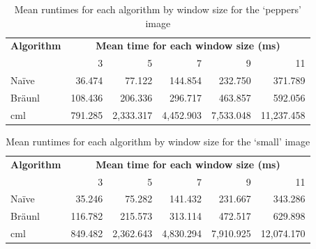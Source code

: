 \begin{table}
\centering
\begin{tabular}{@{}lrrrrr@{}}
\toprule
\multicolumn{1}{c}{\textbf{Algorithm}} & \multicolumn{5}{c}{\textbf{Mean time for each window size (ms)}}  \\
                              & 3       & 5         & 7         & 9         & 11         \\ \midrule
Naïve                         & 36.474  & 77.122    & 144.854   & 232.750   & 371.789    \\
Bräunl                        & 108.436 & 206.336   & 296.717   & 463.857   & 592.056    \\
\gls{cml}                           & 791.285 & 2,333.317 & 4,452.903 & 7,533.048 & 11,237.458 \\ \bottomrule
\end{tabular}
\caption[Mean runtimes for each algorithm for the `peppers' image]{
\label{tab:median:peppers}Mean runtimes for each algorithm by window size for the `peppers' image}
\end{table}

\begin{table}
\centering
\caption[Mean runtimes for each algorithm for the `small' image]{Mean runtimes for each algorithm by window size for the `small' image}
\label{tab:median:small}
\begin{tabular}{@{}lrrrrr@{}}
\toprule
\multicolumn{1}{c}{\textbf{Algorithm}} & \multicolumn{5}{c}{\textbf{Mean time for each window size (ms)}}  \\
                              & 3       & 5         & 7         & 9         & 11         \\ \midrule
Naïve                         & 35.246  & 75.282    & 141.432   & 231.667   & 343.286    \\
Bräunl                        & 116.782 & 215.573   & 313.114   & 472.517   & 629.898    \\
\gls{cml}                           & 849.482 & 2,362.643 & 4,830.294 & 7,910.925 & 12,074.170 \\ \bottomrule
\end{tabular}
\end{table}


